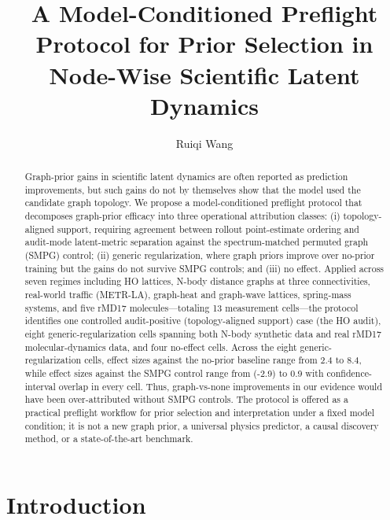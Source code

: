 \documentclass[preprint,12pt]{elsarticle}
\begin{document}
\begin{frontmatter}
\title{A Model-Conditioned Preflight Protocol for Prior Selection in Node-Wise Scientific Latent Dynamics}
\author[inst1]{Ruiqi Wang}
\address[inst1]{Department of Physics, University of California San Diego, La Jolla, CA, United States}
\begin{abstract}

Graph-prior gains in scientific latent dynamics are often reported as
prediction improvements, but such gains do not by themselves show that
the model used the candidate graph topology. We propose a
model-conditioned preflight protocol that decomposes graph-prior
efficacy into three operational attribution classes: (i)
topology-aligned support, requiring agreement between rollout
point-estimate ordering and audit-mode latent-metric separation
against the spectrum-matched permuted graph (SMPG) control;
(ii) generic regularization, where graph priors improve over
no-prior training but the gains do not survive SMPG controls; and
(iii) no effect. Applied across seven regimes including HO lattices,
N-body distance graphs at three connectivities, real-world traffic
(METR-LA), graph-heat and graph-wave lattices, spring-mass systems,
and five rMD17 molecules---totaling 13 measurement cells---the
protocol identifies one controlled audit-positive (topology-aligned
support) case (the HO audit), eight generic-regularization cells
spanning both
N-body synthetic data and real rMD17 molecular-dynamics data, and four
no-effect cells. Across the eight generic-regularization cells, effect
sizes against the no-prior baseline range from 2.4 to 8.4, while effect
sizes against the SMPG control range from (-2.9) to 0.9 with
confidence-interval overlap in every cell. Thus, graph-vs-none
improvements in our evidence would have been over-attributed without
SMPG controls. The protocol is offered as a practical preflight
workflow for prior selection and interpretation under a fixed model
condition; it is not a new graph prior, a universal physics predictor,
a causal discovery method, or a state-of-the-art benchmark.

\end{abstract}
\end{frontmatter}

\section{Introduction}
\end{document}
